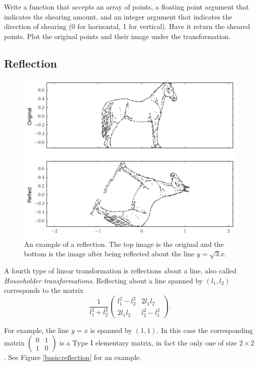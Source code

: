 \begin{problem}
Write a function that accepts an array of points, a floating point argument that indicates the shearing amount, and an integer argument
that indicates the direction of shearing (0 for horizontal, 1 for vertical). Have it return the sheared points.
Plot the original points and their image under the transformation.
\end{problem}

\subsection*{Reflection}

\begin{figure}
\includegraphics[width=\textwidth]{reflect.pdf}
\caption{An example of a reflection. The top image is the original and the bottom is the image after being reflected about the line $y = \sqrt{3}x$.}
\label{basis:reflect}
\end{figure}
A fourth type of linear transformation is reflections about a line, also called \emph{Householder transformations}. Reflecting about a line spanned by $(l_1, l_2)$ corresponds to the matrix
\[
\frac{1}{l_1^2 + l_2^2}
\begin{pmatrix}
l_1^2 - l_2^2 & 2l_1l_2 \\
2l_1l_2 & l_2^2 - l_1^2
\end{pmatrix}.
\]

For example, the line $y=x$ is spanned by $(1, 1)$. In this case the corresponding matrix $\begin{pmatrix}
0 & 1\\
1 & 0
\end{pmatrix}$ is a Type I elementary matrix, in fact the only one of size $2 \times 2$. See Figure \ref{basis:reflection} for an example.

